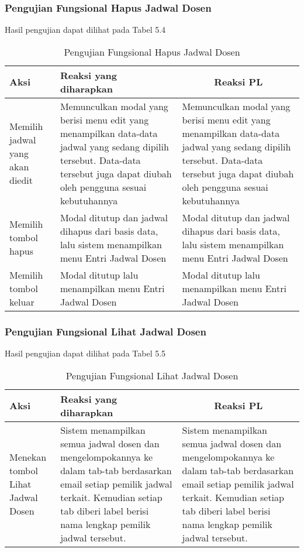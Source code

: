 \subsubsection{Pengujian Fungsional Hapus Jadwal Dosen}
Hasil pengujian dapat dilihat pada Tabel 5.4
\begin{center}
	\begin{table}[H]
		\begin{tabular}{|p{5cm}|p{5cm}|p{5cm}|}
		\hline
		\centering Aksi	& 	\centering Reaksi yang diharapkan &  \multicolumn{1}{c|}{Reaksi PL} \\
		\hline
		Memilih jadwal yang akan diedit & Memunculkan modal yang berisi menu edit yang menampilkan data-data jadwal yang sedang dipilih tersebut. Data-data tersebut juga dapat diubah oleh pengguna sesuai kebutuhannya & Memunculkan modal yang berisi menu edit yang menampilkan data-data jadwal yang sedang dipilih tersebut. Data-data tersebut juga dapat diubah oleh pengguna sesuai kebutuhannya \\
		\hline
		Memilih tombol hapus & Modal ditutup dan jadwal dihapus dari basis data, lalu sistem menampilkan menu Entri Jadwal Dosen & Modal ditutup dan jadwal dihapus dari basis data, lalu sistem menampilkan menu Entri Jadwal Dosen \\
		\hline
		Memilih tombol keluar & Modal ditutup lalu menampilkan menu Entri Jadwal Dosen & Modal ditutup lalu menampilkan menu Entri Jadwal Dosen \\
		\hline
		\end{tabular}
		\caption{Pengujian Fungsional Hapus Jadwal Dosen}
	\end{table}
\end{center}

\subsubsection{Pengujian Fungsional Lihat Jadwal Dosen}
Hasil pengujian dapat dilihat pada Tabel 5.5
\begin{center}
	\begin{table}[H]
		\begin{tabular}{|p{5cm}|p{5cm}|p{5cm}|}
		\hline
		\centering Aksi	& 	\centering Reaksi yang diharapkan &  \multicolumn{1}{c|}{Reaksi PL} \\
		\hline
		Menekan tombol Lihat Jadwal Dosen & 
		Sistem menampilkan semua jadwal dosen dan mengelompokannya ke dalam tab-tab berdasarkan email setiap pemilik jadwal terkait. Kemudian setiap tab diberi label berisi nama lengkap pemilik jadwal tersebut. &
		Sistem menampilkan semua jadwal dosen dan mengelompokannya ke dalam tab-tab berdasarkan email setiap pemilik jadwal terkait. Kemudian setiap tab diberi label berisi nama lengkap pemilik jadwal tersebut.\\
		\hline
		\end{tabular}
		\caption{Pengujian Fungsional Lihat Jadwal Dosen}
	\end{table}
\end{center}

